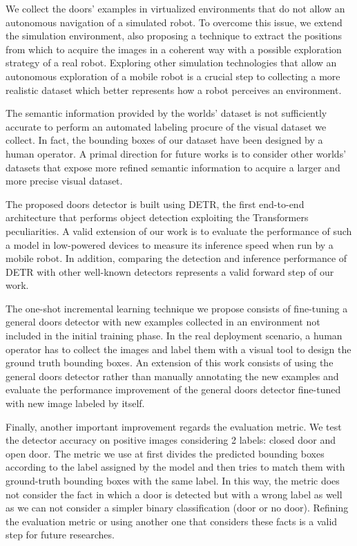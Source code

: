 We collect the doors' examples in virtualized environments that do not allow an autonomous navigation of a simulated robot. To overcome this issue, we extend the simulation environment, also proposing a technique to extract the positions from which to acquire the images in a coherent way with a possible exploration strategy of a real robot. Exploring other simulation technologies that allow an autonomous exploration of a mobile robot is a crucial step to collecting a more realistic dataset which better represents how a robot perceives an environment.

The semantic information provided by the worlds' dataset is not sufficiently accurate to perform an automated labeling procure of the visual dataset we collect. In fact, the bounding boxes of our dataset have been designed by a human operator. A primal direction for future works is to consider other worlds' datasets that expose more refined semantic information to acquire a larger and more precise visual dataset.

The proposed doors detector is built using DETR, the first end-to-end architecture that performs object detection exploiting the Transformers peculiarities. A valid extension of our work is to evaluate the performance of such a model in low-powered devices to measure its inference speed when run by a mobile robot. In addition, comparing the detection and inference performance of DETR with other well-known detectors represents a valid forward step of our work.

The one-shot incremental learning technique we propose consists of fine-tuning a general  doors detector with new examples collected in an environment not included in the initial training phase. In the real deployment scenario, a human operator has to collect the images and label them with a visual tool to design the ground truth bounding boxes. An extension of this work consists of using the general doors detector rather than manually annotating the new examples and evaluate the performance improvement of the general doors detector fine-tuned with new image labeled by itself.

Finally, another important improvement regards the evaluation metric. We test the detector 
accuracy on positive images considering 2 labels: closed door and open door. The metric we use at first divides the predicted bounding boxes according to the label assigned by the model and then tries to match them with ground-truth bounding boxes with the same label. In this way, the metric does not consider the fact in which a door is detected but with a wrong label as well as we can not consider a simpler binary classification (door or no door). Refining the evaluation metric or using another one that considers these facts is a valid step for future researches.



